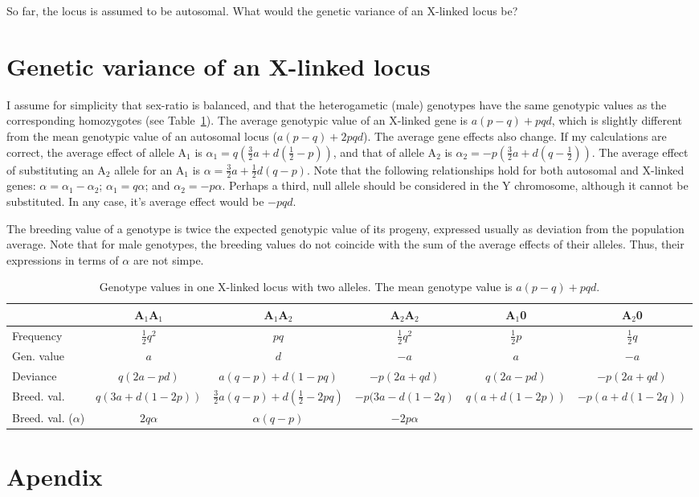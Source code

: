 \documentclass[a4paper,12pt]{article}
\begin{document}
So far, the locus is assumed to be autosomal. What would the genetic variance of an X-linked locus be?

\section{Genetic variance of an X-linked locus}
I assume for simplicity that sex-ratio is balanced, and that the heterogametic (male) genotypes have the same genotypic values as the corresponding homozygotes (see Table~\ref{tau:xlinked}). The average genotypic value of an X-linked gene is $a(p-q)+pqd$, which is slightly different from the mean genotypic value of an autosomal locus ($a(p-q)+2pqd$). The average gene effects also change. If my calculations are correct, the average effect of allele A$_1$ is $\alpha{}_1 = q(\frac{3}{2}a + d(\frac{1}{2}-p))$, and that of allele A$_2$ is $\alpha{}_2 = -p(\frac{3}{2}a + d(q-\frac{1}{2}))$. The average effect of substituting an A$_2$ allele for an A$_1$ is $\alpha = \frac{3}{2}a + \frac{1}{2}d(q-p)$. Note that the following relationships hold for both autosomal and X-linked genes: $\alpha = \alpha{}_1 - \alpha{}_2$; $\alpha{}_1 = q\alpha$; and $\alpha{}_2 = -p\alpha$. Perhaps a third, null allele should be considered in the Y chromosome, although it cannot be substituted. In any case, it's average effect would be $-pqd$.

The breeding value of a genotype is twice the expected genotypic value of its progeny, expressed usually as deviation from the population average. Note that for male genotypes, the breeding values do not coincide with the sum of the average effects of their alleles. Thus, their expressions in terms of $\alpha$ are not simpe.

\begin{table}
\begin{center}
\caption{Genotype values in one X-linked locus with two alleles. The mean genotype value is $a(p-q)+pqd$.}\label{tau:xlinked}
\vspace*{0.3cm}
{\footnotesize
\begin{tabular}{p{2cm}ccccc}
\toprule
&A$_1$A$_1$&A$_1$A$_2$&A$_2$A$_2$&A$_1$0&A$_2$0\\
\midrule
Frequency&$\frac{1}{2}q^2$&$pq$&$\frac{1}{2}q^2$&$\frac{1}{2}p$&$\frac{1}{2}q$\\
Gen. value&$a$&$d$&$-a$&$a$&$-a$\\
Deviance&$q(2a-pd)$&$a(q-p)+d(1-pq)$&$-p(2a+qd)$&$q(2a-pd)$&$-p(2a+qd)$\\
Breed. val.&$q(3a+d(1-2p))$&$\frac{3}{2}a(q-p)+d(\frac{1}{2}-2pq)$&$-p(3a-d(1-2q)$&$q(a+d(1-2p))$&$-p(a+d(1-2q))$\\
Breed. val. ($\alpha$)&$2q\alpha$&$\alpha(q-p)$&$-2p\alpha$&&\\
\bottomrule
\end{tabular}
}
\end{center}
\end{table}

\section{Apendix}



\end{document}
